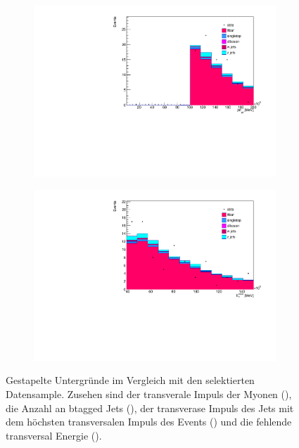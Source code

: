 \begin{figure}[H]
\begin{subfigure}{0.5\textwidth}
    \includegraphics[width=\linewidth]{plots_and_txt/stacked_plots/stacked_jet_pt.pdf}
    \caption{}
    \label{fig:stacked_jet_pt_good}
  \end{subfigure}%
  \begin{subfigure}{0.5\textwidth}
    \centering
    \includegraphics[width=\linewidth]{plots_and_txt/stacked_plots/stacked_met_et.pdf}
    \caption{}
    \label{fig:stacked_met_et}
  \end{subfigure}%
  \caption{Gestapelte Untergründe im Vergleich mit den selektierten Datensample.
  Zusehen sind der transverale Impuls der Myonen (),
  die Anzahl an btagged Jets (),
  der transverase Impuls des Jets mit dem höchsten transversalen Impuls des Events () und die fehlende transversal Energie ().
  }
  \label{fig:stackedex}
\end{figure}


